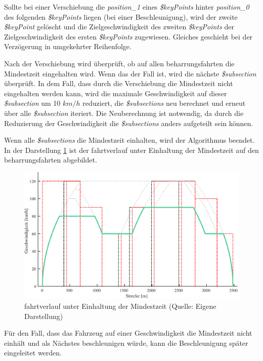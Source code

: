 Sollte bei einer Verschiebung die \textit{position\_1} eines \textit{\$keyPoints} hinter \textit{position\_0} des folgenden \textit{\$keyPoints} liegen (bei einer Beschleunigung), wird der zweite \textit{\$keyPoint} gelöscht und die Zielgeschwindigkeit des zweiten \textit{\$keyPoints} der Zielgeschwindigkeit des ersten \textit{\$keyPoints} zugewiesen. Gleiches geschieht bei der Verzögerung in umgekehrter Reihenfolge. 

Nach der Verschiebung wird überprüft, ob auf allen \Gls{beharrungsfahrt}en die Mindestzeit eingehalten wird. Wenn das der Fall ist, wird die nächste \textit{\$subsection} überprüft. In dem Fall, dass durch die Verschiebung die Mindestzeit nicht eingehalten werden kann, wird die maximale Geschwindigkeit auf dieser \textit{\$subsection} um 10 $km/h$ reduziert, die \textit{\$subsections} neu berechnet und erneut über alle \textit{\$subsection} iteriert. Die Neuberechnung ist notwendig, da durch die Reduzierung der Geschwindigkeit die \textit{\$subsections} anders aufgeteilt sein können.

Wenn alle \textit{\$subsections} die Mindestzeit einhalten, wird der Algorithmus beendet. In der Darstellung \ref{fig:it9} ist der \Gls{fahrtverlauf} unter Einhaltung der Mindestzeit auf den \Gls{beharrungsfahrt}en abgebildet.
\begin{figure}
\includegraphics[width=\linewidth]{../images/matlab/it9.pdf}
\caption[\Gls{fahrtverlauf} unter Einhaltung der Mindestzeit]{\Gls{fahrtverlauf} unter Einhaltung der Mindestzeit (Quelle: Eigene Darstellung)}
\label{fig:it9}
\end{figure}
Für den Fall, dass das Fahrzeug auf einer Geschwindigkeit die Mindestzeit nicht einhält und als Nächstes beschleunigen würde, kann die Beschleunigung später eingeleitet werden. 

